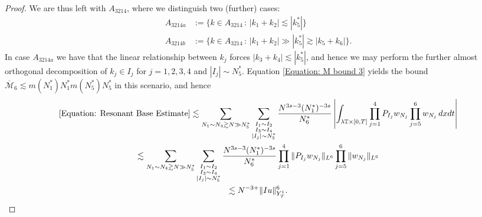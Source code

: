 \documentclass[10pt,a4paper]{amsart}
\begin{document}
\begin{proof}
    We are thus left with $A_{3214}$, where we distinguish two (further) cases:
    \begin{align*}
        A_{3214a} &:= \{k\in A_{3214}\,:\,|k_1+k_2|\lesssim |k_5^*|\}\\
        A_{3214b} &:= \{k\in A_{3214}\,:\,|k_1+k_2|\gg |k_5^*|\gtrsim |k_5+k_6|\}.
    \end{align*}
    In case $A_{3214a}$ we have that the linear relationship between $k_j$ forces $|k_3+k_4|\lesssim |k_5^*|$, and hence we may perform the further almost orthogonal decomposition of $k_j\in I_j$ for $j=1,2,3,4$ and $|I_j|\sim N_5^*$. Equation \eqref{Equation: M bound 3} yields the bound $\overline{\mathcal{M}}_6\lesssim m(N_1^*)N_1^*m(N_5^*)N_5^*$ in this scenario, and hence
    \begin{multline*}
        \eqref{Equation: Resonant Base Estimate}\lesssim \sum_{N_1\sim N_4\gtrsim N\gg N_5^*}\sum_{\substack{I_1\sim I_2\\ I_3\sim I_4\\|I_j|\sim N_5^*}}\frac{N^{3s-3}(N_1^*)^{-3s}}{N_6^*}\left|\int_{\lambda\mathbb{T}\times [0,T]}\prod_{j=1}^4P_{I_j}w_{N_j}\prod_{j=5}^6w_{N_j}\,dxdt\right|\\
        \lesssim \sum_{N_1\sim N_4\gtrsim N\gg N_5^*}\sum_{\substack{I_1\sim I_2\\ I_3\sim I_4\\|I_j|\sim N_5^*}}\frac{N^{3s-3}(N_1^*)^{-3s}}{N_6^*}\prod_{j=1}^4\|P_{I_j}w_{N_j}\|_{L^6}\prod_{j=5}^6\|w_{N_j}\|_{L^6}\\
        \lesssim N^{-3+}\|Iu\|_{Y^1_T}^6.
    \end{multline*}


\end{proof}
\end{document}
